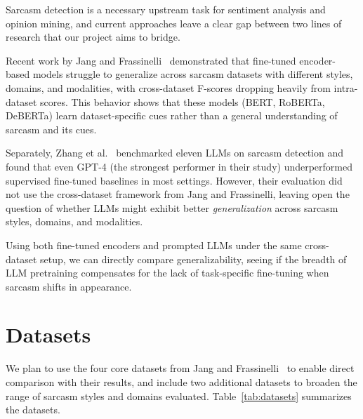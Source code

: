 \documentclass[sigconf, nonacm]{acmart}
\begin{document}
Sarcasm detection is a necessary upstream task for sentiment analysis and opinion mining, and current approaches leave a clear gap between two lines of research that our project aims to bridge.

Recent work by Jang and Frassinelli~\cite{jang2024generalizablesarcasmdetectionjust} demonstrated that fine-tuned encoder-based models struggle to generalize across sarcasm datasets with different styles, domains, and modalities, with cross-dataset F-scores dropping heavily from intra-dataset scores. This behavior shows that these models (BERT, RoBERTa, DeBERTa) learn dataset-specific cues rather than a general understanding of sarcasm and its cues.

Separately, Zhang et al.~\cite{zhang2024sarcasmbench} benchmarked eleven LLMs on sarcasm detection and found that even GPT-4 (the strongest performer in their study) underperformed supervised fine-tuned baselines in most settings. However, their evaluation did not use the cross-dataset framework from Jang and Frassinelli, leaving open the question of whether LLMs might exhibit better \textit{generalization} across sarcasm styles, domains, and modalities.

Using both fine-tuned encoders and prompted LLMs under the same cross-dataset setup, we can directly compare generalizability, seeing if the breadth of LLM pretraining compensates for the lack of task-specific fine-tuning when sarcasm shifts in appearance.

\section{Datasets}

We plan to use the four core datasets from Jang and Frassinelli~\cite{jang2024generalizablesarcasmdetectionjust} to enable direct comparison with their results, and include two additional datasets to broaden the range of sarcasm styles and domains evaluated. Table~\ref{tab:datasets} summarizes the datasets.
\end{document}
